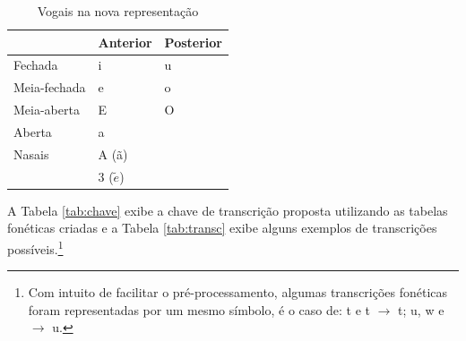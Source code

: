 \begin{center}
\begin{table}[H]
\begin{center}
    \begin{tabular}{lll}
        \hline
         & Anterior & Posterior \\
         \hline
        Fechada & i & u \\
        \hline
        Meia-fechada & e & o \\
        \hline
        Meia-aberta & E & O \\
        \hline
        Aberta & a &  \\
        \hline
        Nasais & A (ã) &\\ & 3 ($\tilde{e}$) &\\ 
        \hline
    \end{tabular}
\end{center}
\caption{Vogais na nova representação}
\label{tab:new_vocals}
\end{table}
\end{center}

  A Tabela \ref{tab:chave} exibe a chave de transcrição proposta utilizando as tabelas  fonéticas criadas e a Tabela \ref{tab:transc} exibe alguns exemplos de transcrições possíveis.\footnote{Com intuito de facilitar o pré-processamento, algumas transcrições fonéticas foram representadas por um mesmo símbolo, é o caso de: t e t $\rightarrow$ t; u, w e \textupsilon $\rightarrow$ u.}  

